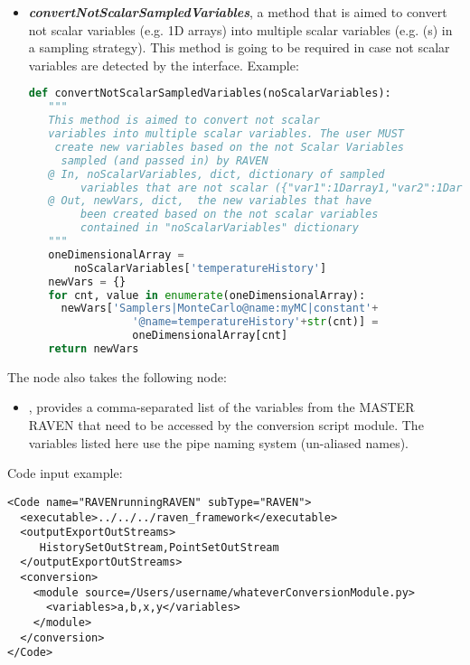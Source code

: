 \begin{itemize}
\begin{itemize}
\begin{itemize}
\begin{itemize}
                 \item \textbf{\textit{convertNotScalarSampledVariables}}, a method that is aimed to convert not scalar variables (e.g. 1D arrays) into multiple scalar variables
                 (e.g.  (s) in a sampling strategy).
                  This method is going to be required in case not scalar variables are detected by the interface.
                  Example:
                  \begin{lstlisting}[language=python]
 def convertNotScalarSampledVariables(noScalarVariables):
   """
   This method is aimed to convert not scalar
   variables into multiple scalar variables. The user MUST
    create new variables based on the not Scalar Variables
     sampled (and passed in) by RAVEN
   @ In, noScalarVariables, dict, dictionary of sampled
        variables that are not scalar ({"var1":1Darray1,"var2":1Darray2})
   @ Out, newVars, dict,  the new variables that have
        been created based on the not scalar variables
        contained in "noScalarVariables" dictionary
   """
   oneDimensionalArray =
       noScalarVariables['temperatureHistory']
   newVars = {}
   for cnt, value in enumerate(oneDimensionalArray):
     newVars['Samplers|MonteCarlo@name:myMC|constant'+
                '@name=temperatureHistory'+str(cnt)] =
                oneDimensionalArray[cnt]
   return newVars
                  \end{lstlisting}
              \end{itemize} %
        \end{itemize} %
        The  node also takes the following node:
        \begin{itemize} %
          \item {},  provides a comma-separated list of
            the variables from the MASTER RAVEN that need to be accessed by the conversion script module.  The
            variables listed here use the pipe naming system (un-aliased names).
        \end{itemize} %
    \end{itemize} %
\end{itemize} %

Code input example:
\begin{lstlisting}[style=XML]
<Code name="RAVENrunningRAVEN" subType="RAVEN">
  <executable>../../../raven_framework</executable>
  <outputExportOutStreams>
     HistorySetOutStream,PointSetOutStream
  </outputExportOutStreams>
  <conversion>
    <module source=/Users/username/whateverConversionModule.py>
      <variables>a,b,x,y</variables>
    </module>
  </conversion>
</Code>
\end{lstlisting}

